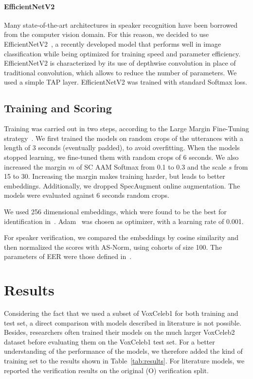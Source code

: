 \documentclass[conference]{IEEEtran}
\begin{document}
\paragraph{EfficientNetV2}

Many state-of-the-art architectures in speaker recognition have been borrowed from the computer vision domain. For this reason, we decided to use EfficientNetV2~\cite{tan2021efficientnetv2}, a recently developed model that performs well in image classification while being optimized for training speed and parameter efficiency. EfficientNetV2 is characterized by its use of depthwise convolution in place of traditional convolution, which allows to reduce the number of parameters. We used a simple TAP layer. EfficientNetV2 was trained with standard Softmax loss.

\subsection{Training and Scoring}

Training was carried out in two steps, according to the Large Margin Fine-Tuning strategy~\cite{thienpondt2021voxsrc}. We first trained the models on random crops of the utterances with a length of 3 seconds (eventually padded), to avoid overfitting. When the models stopped learning, we fine-tuned them with random crops of 6 seconds. We also increased the margin $m$ of SC AAM Softmax from 0.1 to 0.3 and the scale $s$ from 15 to 30. Increasing the margin makes training harder, but leads to better embeddings. Additionally, we dropped SpecAugment online augmentation. The models were evaluated against 6 seconds random crops.

We used 256 dimensional embeddings, which were found to be the best for identification in~\cite{hajibabaei2018unified}. Adam~\cite{kingma2014adam} was chosen as optimizer, with a learning rate of 0.001. 

For speaker verification, we compared the embeddings by cosine similarity and then normalized the scores with AS-Norm, using cohorts of size 100. The parameters of EER were those defined in~\cite{nist2018}.

\section{Results}

Considering the fact that we used a subset of VoxCeleb1 for both training and test set, a direct comparison with models described in literature is not possible. Besides, researchers often trained their models on the much larger VoxCeleb2 dataset before evaluating them on the VoxCeleb1 test set. For a better understanding of the performance of the models, we therefore added the kind of training set to the results shown in Table~\ref{tab:results}. For literature models, we reported the verification results on the original (O) verification split.
\end{document}
